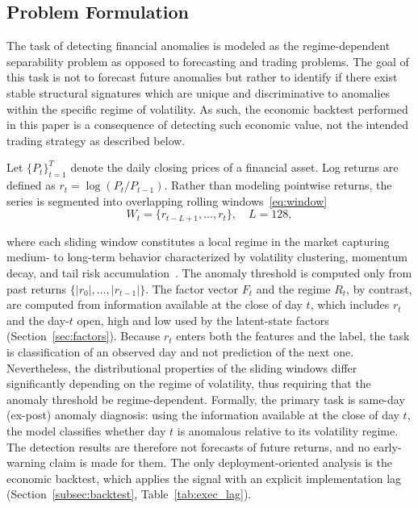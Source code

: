\documentclass[]{interact}
\begin{document}
\subsection{Problem Formulation}
\label{sec:problem_formulation}
The task of detecting financial anomalies is modeled as
the regime-dependent separability problem as opposed to forecasting and trading problems. The goal of this task is not to
forecast future anomalies but rather to identify if there exist
stable structural signatures which are unique and discriminative to anomalies within the specific regime of volatility. As
such, the economic backtest performed in this paper is a consequence of detecting such economic value, not the intended
trading strategy as described below.

Let $\{P_t\}_{t=1}^{T}$ denote the daily closing prices of a financial asset. Log returns are defined as $r_t = \log(P_t / P_{t-1})$. Rather than modeling pointwise returns, the series is segmented into overlapping rolling windows~\eqref{eq:window}
\begin{equation}
    W_t = \{ r_{t-L+1}, \ldots, r_t \}, \quad L = 128,
    \label{eq:window}
\end{equation}

where each sliding window constitutes a local regime in the
market capturing medium- to long-term behavior characterized by volatility clustering, momentum decay, and tail risk
accumulation~\citep{bouchaud2001more}. The anomaly threshold is computed only from past returns $\{|r_0|,\ldots,|r_{t-1}|\}$. The factor vector $F_t$ and the regime $R_t$, by contrast, are computed from information available at the close of day $t$, which includes $r_t$ and the day-$t$ open, high and low used by the latent-state factors (Section~\ref{sec:factors}). Because $r_t$ enters both the features and the label, the task is classification of an observed day and not prediction of the next one. Nevertheless, the distributional properties of the sliding windows differ significantly depending on the regime of volatility, thus requiring that the anomaly threshold be regime-dependent. Formally, the primary task is same-day (ex-post) anomaly diagnosis: using the information available at the close of day $t$, the model classifies whether day $t$ is anomalous relative to its volatility regime. The detection results are therefore not forecasts of future returns, and no early-warning claim is made for them. The only deployment-oriented analysis is the economic backtest, which applies the signal with an explicit implementation lag (Section~\ref{subsec:backtest}, Table~\ref{tab:exec_lag}).
\end{document}
